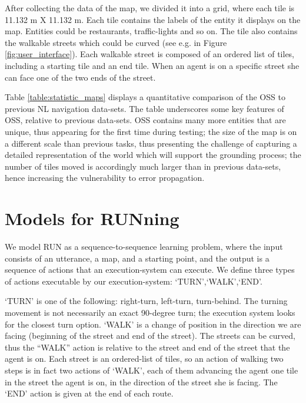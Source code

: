 \documentclass[11pt,a4paper]{article}
\begin{document}
After collecting the data of the map, we divided it into a grid, where each tile is 11.132 m X 11.132 m. Each tile contains the labels of the entity it displays on the map. Entities could be restaurants, traffic-lights and so on. The tile also contains the walkable streets which could be curved (see e.g. in Figure \ref{fig:user_interface}). Each walkable street is composed of an ordered list of tiles, including a starting tile and an end tile. When an agent is on a specific street she can face one of the two ends of the street. 




 Table \ref{table:statistic_maps} displays a quantitative comparison of the OSS to previous NL navigation data-sets.  
 The table underscores some key features of OSS, relative to previous data-sets.
 OSS contains many more entities that are unique, thus appearing for the first time during testing; the size of the map is on a different scale than previous tasks, thus presenting the challenge of capturing a detailed representation of the world which will support the grounding process; the number of tiles moved is accordingly much larger than in previous data-sets, hence increasing the vulnerability to error propagation.




\section{Models for RUNning}
\label{models}



We model RUN as a sequence-to-sequence learning problem, where the input consists of an utterance, a map, and a starting point, and the output is a sequence of actions that an execution-system can execute.   We define three types of actions executable by our execution-system:
\enquote*{TURN},\enquote*{WALK},\enquote*{END}.%

\enquote*{TURN} is one of the following: right-turn, left-turn, turn-behind. The turning movement is not necessarily an exact 90-degree turn; the execution system looks for the closest turn option. 
\enquote*{WALK} is a change of position in the direction we are facing (beginning of the street and end of the street). The streets can be curved, thus the \enquote{WALK} action is relative to the street and end of the street that the agent is on. Each street is an ordered-list of tiles, so an action of walking two steps is in fact two actions of \enquote*{WALK}, each of them advancing the agent one tile in the  street the agent is on, in the direction of the street she is facing.
The \enquote*{END} action is given at the end of each route.
 
\end{document}
